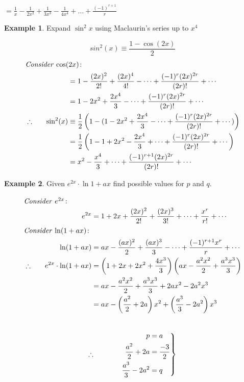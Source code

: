 \documentclass[12pt, a4paper]{report}
\theoremstyle{definition}
\newtheorem{example}{Example}
\begin{document}
	\begin{center}
		$=\frac{1}{x} - \frac{1}{2x^2} + \frac{1}{3x^3} - \frac{1}{4x^4} + \ldots + \frac{(-1)^{r+1}}{r} $
	\end{center}
	\hrulefill
	\begin{example}
		Expand $\sin^2{x}$ using Maclaurin's series up to $x^4$
	\end{example}
	\bigskip
	$$sin^2(x)\equiv\frac{1-\cos(2x)}{2}$$
	\begin{alignat*}{2}
		\intertext{\emph{Consider} $\cos(2x)\colon$} &                 &           & =1-\frac{(2x)^{2}}{2!} + \frac{(2x)^4}{4!}  - \cdots + \frac{(-1)^r(2x)^{2r}}{(2r)!}+\cdots           \\
		&                 &           & =1-2x^2+\frac{2x^4}{3}-\cdots+\frac{(-1)^r(2x)^{2r}}{(2r)!}+\cdots                                    \\
		& \therefore\quad & \sin^2(x) & \equiv \frac{1}{2}\left( 1-(1-2x^2+\frac{2x^4}{3}-\cdots+\frac{(-1)^r(2x)^{2r}}{(2r)!}+\cdots)\right) \\
		&                 &           & =\frac{1}{2}\left(1-1+2x^2 - \frac{2x^4}{3} +\cdots+\frac{(-1)^r(2x)^{2r}}{(2r)!}+\cdots\right)       \\
		&                 &           & =x^2-\frac{x^4}{3} +\cdots+\frac{(-1)^{r+1}(2x)^{2r}}{(2r)!}+\cdots                                   
	\end{alignat*}
	\newpage
	\begin{example}
		Given $e^{2x}\cdot \ln{1+ax}$ find possible values for $p$ and $q$.
	\end{example}
	\begin{alignat*}{2}
		\intertext{\emph{Consider} $e^{2x}\colon$}
		&                 & e^{2x}                & = 1+2x + \frac{(2x)^2}{2!} + \frac{(2x)^{3}}{3!} +\cdots +  \frac{x^r}{r!} + \cdots           \\
		\intertext{\emph{Consider} $\ln(1+ax)\colon$}
		&                 & \ln(1+ax)             & = ax - \frac{(ax)^2}{2} + \frac{(ax)^3}{3} - \cdots + \frac{(-1)^{r+1}x^r}{r} + \cdots        \\
		& \therefore\quad & e^{2x}\cdot \ln(1+ax) & = \left(1+2x+2x^2+\frac{4x^3}{3}\right) \left(ax - \frac{a^2x^2}{2} + \frac{a^3x^3}{3}\right) \\
		&                 &                       & =ax-\frac{a^2x^2}{2}+\frac{a^3x^3}{3}+2ax^2-2a^2x^3                                           \\
		&                 &                       & =ax-\left(\frac{a^2}{2}+2a\right) x^2+\left( \frac{a^3}{3}-2a^2\right) x^3                    
	\end{alignat*}
	~\\
	\begin{equation*}
		\therefore\left.
		\begin{alignedat}{2}
			\hspace{0.5 in}	&&p&=a\\
			&&	\frac{a^2}{2}+2a&=\frac{-3}{2}\\
			&&	\frac{a^3}{3}-2a^2&=q
		\end{alignedat}	\right\}
	\end{equation*}
	
\end{document}
